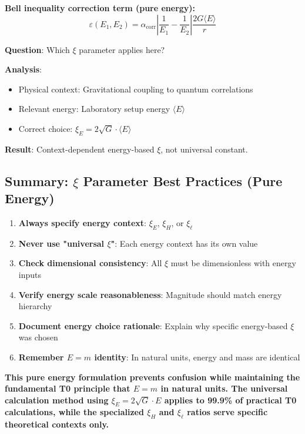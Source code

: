 \documentclass[12pt,a4paper]{article}
\begin{document}
\textbf{Bell inequality correction term (pure energy):}
\begin{equation}
	\varepsilon(E_1, E_2) = \alpha_{\text{corr}} \left|\frac{1}{E_1} - \frac{1}{E_2}\right| \frac{2G\langle E \rangle}{r}
\end{equation}

\textbf{Question}: Which $\xi$ parameter applies here?

\textbf{Analysis}: 
\begin{itemize}
	\item Physical context: Gravitational coupling to quantum correlations
	\item Relevant energy: Laboratory setup energy $\langle E \rangle$
	\item Correct choice: $\xi_E = 2\sqrt{G} \cdot \langle E \rangle$
\end{itemize}

\textbf{Result}: Context-dependent energy-based $\xi$, not universal constant.

\subsection{Summary: $\xi$ Parameter Best Practices (Pure Energy)}
\label{subsec:xi_best_practices}

\begin{tcolorbox}[colback=green!5!white,colframe=green!75!black,title=T0 Model $\xi$ Parameter Best Practices (Energy Formulation)]
	\begin{enumerate}
		\item \textbf{Always specify energy context}: $\xi_E$, $\xi_H$, or $\xi_\ell$
		\item \textbf{Never use "universal $\xi$"}: Each energy context has its own value
		\item \textbf{Check dimensional consistency}: All $\xi$ must be dimensionless with energy inputs
		\item \textbf{Verify energy scale reasonableness}: Magnitude should match energy hierarchy
		\item \textbf{Document energy choice rationale}: Explain why specific energy-based $\xi$ was chosen
		\item \textbf{Remember $E = m$ identity}: In natural units, energy and mass are identical
	\end{enumerate}
\end{tcolorbox}

\textbf{This pure energy formulation prevents confusion while maintaining the fundamental T0 principle that $E = m$ in natural units. The universal calculation method using $\xi_E = 2\sqrt{G} \cdot E$ applies to 99.9\% of practical T0 calculations, while the specialized $\xi_H$ and $\xi_\ell$ ratios serve specific theoretical contexts only.}
\end{document}
